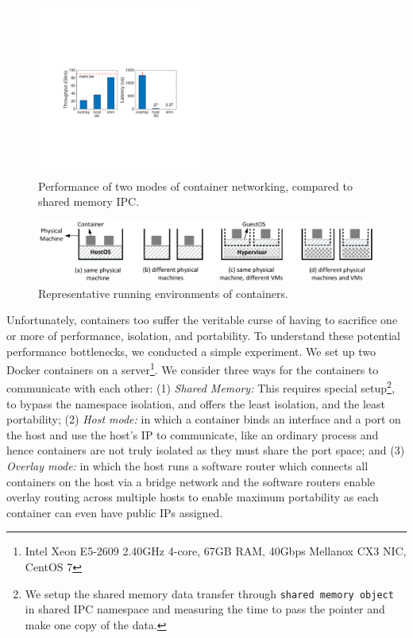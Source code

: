 \begin{figure}[th]
     \centering 
     \includegraphics[width=0.5\textwidth]{figures/intro/intro_exist2.pdf} 
     \caption{Performance of two modes of container networking, compared to
     shared memory IPC.} 
     \label{fig:three_modes} 
\end{figure} 
\begin{figure} [t]
	\centering   
	\includegraphics[width=6.7in]{figures/deployment-cases.pdf}   
	\caption{\label{fig:deploy-cases} Representative running environments of containers.}   
\end{figure}

Unfortunately, containers too suffer the veritable curse of having to sacrifice
one or more of performance, isolation, and portability. To understand these
potential performance bottlenecks, we conducted a simple experiment.  We set up
two Docker containers on a server\footnote{Intel Xeon E5-2609 2.40GHz 4-core,
67GB RAM, 40Gbps Mellanox CX3 NIC, CentOS 7}. We consider three
ways for the containers to communicate with each other: (1) {\em Shared Memory:}
This requires special setup\footnote{We setup the shared memory data transfer
through \texttt{shared memory object} in shared IPC namespace and measuring the
time to pass the pointer and make one copy of the data.}, to bypass the
namespace isolation, and offers the least isolation, and the least portability;
(2) {\em Host mode:} in which a container binds an interface and a port on the
host and use the host's IP to communicate, like an ordinary process and hence
containers are not truly isolated as they must share the port space; and (3)
{\em Overlay mode:} in which the host runs a software router which connects all
containers on the host via a bridge network and the software routers enable
overlay routing across multiple hosts to enable maximum portability as each
container can even have public IPs assigned.

